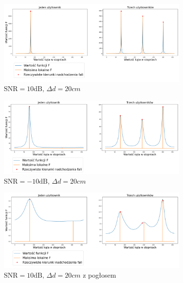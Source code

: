 \begin{figure}[H]
    \centering
    \includegraphics[width=0.85\textwidth]{Images/music_10db_0.2m.png}
    \caption{$\mathrm{SNR}=10\mathrm{dB}, \, \Delta d = 20cm$}
    \label{fig:music_10db_20cm}
\end{figure}

\begin{figure}[H]
    \centering
    \includegraphics[width=0.85\textwidth]{Images/music_-10db_0.2m.png}
    \caption{$\mathrm{SNR}=-10\mathrm{dB}, \, \Delta d = 20cm$}
    \label{fig:music_-10db_20cm}
\end{figure}

\begin{figure}[H]
    \centering
    \includegraphics[width=0.85\textwidth]{Images/music_10db_reverb_0.2m.png}
    \caption{$\mathrm{SNR}=10\mathrm{dB}, \, \Delta d = 20cm$ z pogłosem}
    \label{fig:music_10db_20cm_reverb}
\end{figure}

